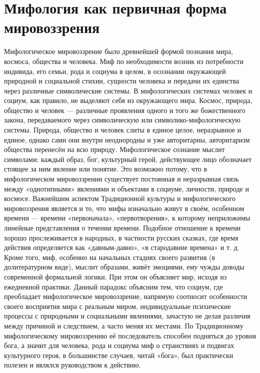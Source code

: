 \documentclass[12pt]{article}
\begin{document}
\section{Мифология как первичная форма мировоззрения}
Мифологическое мировоззрение было древнейшей формой познания мира, космоса, общества и человека. Миф
по  необходимости  возник  из  потребности  индивида,  его  семьи,  рода  и  социума  в  целом,  в  осознании
окружающей природной и социальной стихии, сущности человека и передачи их единства через различные
символические системы. В мифологических системах человек и социум, как правило, не выделяют себя из
окружающего  мира.  Космос,  природа,  общество  и  человек ---  различные  проявления одного и того же
божественного  закона,  передаваемого  через  символическую  или  символико-мифологическую  системы.
Природа,  общество  и  человек  слиты  в  единое  целое,  неразрывное  и  единое,  однако  сами  они  внутри
неоднородны и уже авторитарны, авторитаризм общества перенесён на всю природу.
Мифологическое  сознание  мыслит  символами:  каждый  образ,  бог,  культурный  герой,  действующее  лицо
обозначает стоящее за ним явление или понятие. Это возможно потому, что в мифологическом мировоззрении
существует  постоянная  и  неразрывная  связь  между  «однотипными»  явлениями  и  объектами  в  социуме,
личности, природе и космосе.
Важнейшим аспектом Традиционной культуры и мифологического мировоззрения является и то, что мифы
изначально  живут  в  своём,  особенном  времени --- времени «первоначала», «первотворения», к которому
неприложимы  линейные  представления  о  течении  времени.  Подобное  отношение  к  времени  хорошо
прослеживается  в  народных,  в  частности русских  сказках,  где время  действия  определяется как «давным-давно», «в стародавние времена» и т. д.
Кроме того, миф, особенно на начальных стадиях своего развития (в долитературном виде), мыслит образами,
живёт эмоциями, ему чужды доводы современной формальной логики. При этом он объясняет мир, исходя из
ежедневной  практики.  Данный  парадокс  объясним  тем,  что  социум,  где  преобладает  мифологическое
мировоззрение, напрямую соотносит особенности своего восприятия мира с реальным миром, индивидуальные
психические процессы с природными и социальными явлениями, зачастую не делая различия между причиной
и следствием, а часто меняя их местами.
По Традиционному мифологическому мировоззрению её последователь способен подняться до уровня бога, а
значит для человека, рода и социума миф о странствиях и подвигах культурного героя, в большинстве случаев,
читай «бога», был практически полезен и являлся руководством к действию.
\end{document}
